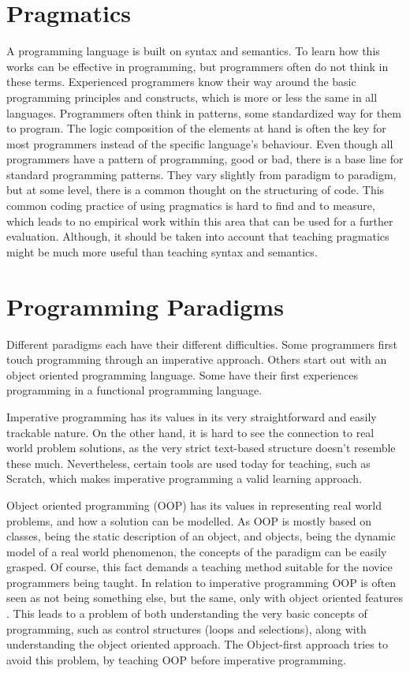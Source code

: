 \section{Pragmatics}
A programming language is built on syntax and semantics. To learn how this works can be effective in programming, but programmers often do not think in these terms. Experienced programmers know their way around the basic programming principles and constructs, which is more or less the same in all languages. Programmers often think in patterns, some standardized way for them to program. The logic composition of the elements at hand is often the key for most programmers instead of the specific language's behaviour. Even though all programmers have a pattern of programming, good or bad, there is a base line for standard programming patterns. They vary slightly from paradigm to paradigm, but at some level, there is a common thought on the structuring of code. This common coding practice of using pragmatics is hard to find and to measure, which leads to no empirical work within this area that can be used for a further evaluation. Although, it should be taken into account that teaching pragmatics might be much more useful than teaching syntax and semantics.


\section{Programming Paradigms}
Different paradigms each have their different difficulties. Some programmers first touch programming through an imperative approach. Others start out with an object oriented programming language. Some have their first experiences programming in a functional programming language.

Imperative programming has its values in its very straightforward and easily trackable nature. On the other hand, it is hard to see the connection to real world problem solutions, as the very strict text-based structure doesn't resemble these much. Nevertheless, certain tools are used today for teaching, such as Scratch, which makes imperative programming a valid learning approach.

Object oriented programming (OOP) has its values in representing real world problems, and how a solution can be modelled. As OOP is mostly based on classes, being the static description of an object, and objects, being the dynamic model of a real world phenomenon, the concepts of the paradigm can be easily grasped. Of course, this fact demands a teaching method suitable for the novice programmers being taught. In relation to imperative programming OOP is often seen as not being something else, but the same, only with object oriented features \cite{Garner05}. This leads to a problem of both understanding the very basic concepts of programming, such as control structures (loops and selections), along with understanding the object oriented approach. The Object-first approach tries to avoid this problem, by teaching OOP before imperative programming.

